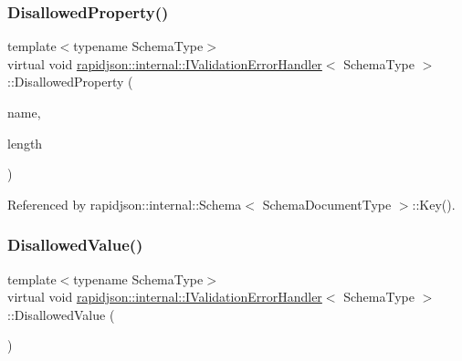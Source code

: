 \subsubsection{\texorpdfstring{DisallowedProperty()}{DisallowedProperty()}}
{\footnotesize\ttfamily template$<$typename Schema\+Type$>$ \\
virtual void \mbox{\hyperlink{classrapidjson_1_1internal_1_1_i_validation_error_handler}{rapidjson\+::internal\+::\+I\+Validation\+Error\+Handler}}$<$ Schema\+Type $>$\+::Disallowed\+Property (\begin{DoxyParamCaption}\item[{const \mbox{\hyperlink{classrapidjson_1_1internal_1_1_i_validation_error_handler_a02c672a313401138fd08504062f3d1d0}{Ch}} $\ast$}]{name,  }\item[{\mbox{\hyperlink{namespacerapidjson_a44eb33eaa523e36d466b1ced64b85c84}{Size\+Type}}}]{length }\end{DoxyParamCaption})\hspace{0.3cm}{\ttfamily [pure virtual]}}



Referenced by rapidjson\+::internal\+::\+Schema$<$ Schema\+Document\+Type $>$\+::\+Key().

\mbox{\label{classrapidjson_1_1internal_1_1_i_validation_error_handler_a9b65773a1bf017098548dcec94b7bebc}} 
\subsubsection{\texorpdfstring{DisallowedValue()}{DisallowedValue()}}
{\footnotesize\ttfamily template$<$typename Schema\+Type$>$ \\
virtual void \mbox{\hyperlink{classrapidjson_1_1internal_1_1_i_validation_error_handler}{rapidjson\+::internal\+::\+I\+Validation\+Error\+Handler}}$<$ Schema\+Type $>$\+::Disallowed\+Value (\begin{DoxyParamCaption}{ }\end{DoxyParamCaption})\hspace{0.3cm}{\ttfamily [pure virtual]}}



